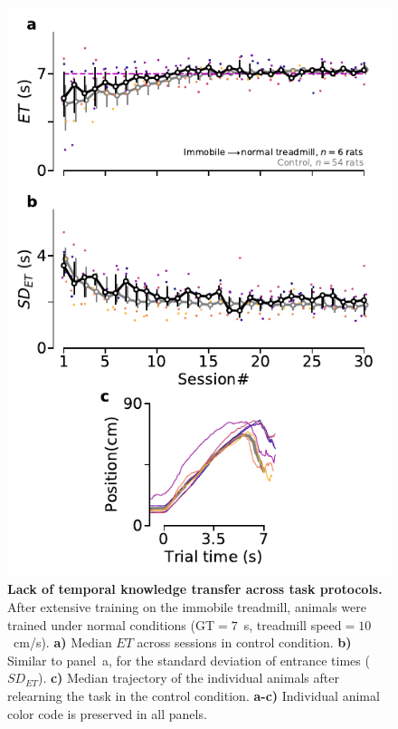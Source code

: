 \begin{figure}[bt!]
  \begin{center}
    \includegraphics[width=.4\linewidth]{ch-time/figures/Imm2CtrlTrd.pdf}
    \caption[Immobile animals relearning the task]
    {\textbf{Lack of temporal knowledge transfer across task protocols.}
    After extensive training on the immobile treadmill, animals were trained under normal conditions (GT$=7$~s, treadmill speed$=10$~cm/s).
    \textbf{a)}
    Median $ET$ across sessions in control condition.
    \textbf{b)}
    Similar to panel~a, for the standard deviation of entrance times ($SD_{ET}$).
    \textbf{c)}
    Median trajectory of the individual animals after relearning the task in the control condition.
    \textbf{a-c)}
    Individual animal color code is preserved in all panels.
    }
    \label{fig:time:Imm2Ctrl}
  \end{center}
\end{figure}
